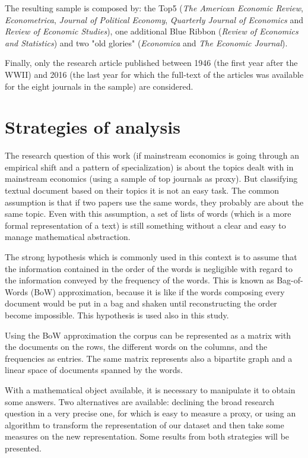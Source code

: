 \documentclass[a4paper, 11pt, headings=standardclasses, tablecaptionsbelow]{scrartcl}
\begin{document}
The resulting sample is composed by: the Top5 (\textit{The American Economic Review}, \textit{Econometrica}, \textit{Journal of Political Economy}, \textit{Quarterly Journal of Economics} and \textit{Review of Economic Studies}), one additional Blue Ribbon (\textit{Review of Economics and Statistics}) and two "old glories" (\textit{Economica} and \textit{The Economic Journal}).

Finally, only the research article published between 1946 (the first year after the WWII) and 2016 (the last year for which the full-text of the articles was available for the eight journals in the sample) are considered.

\section{Strategies of analysis}
The research question of this work (if mainstream economics is going through an empirical shift and a pattern of specialization) is about the topics dealt with in mainstream economics (using a sample of top journals as proxy).
But classifying textual document based on their topics it is not an easy task. The common assumption is that if two papers use the same words, they probably are about the same topic. Even with this assumption, a set of lists of words (which is a more formal representation of a text) is still something without a clear and easy to manage mathematical abstraction.

The strong hypothesis which is commonly used in this context is to assume that the information contained in the order of the words is negligible with regard to the information conveyed by the frequency of the words. This is known as Bag-of-Words (BoW) approximation, because it is like if the words composing every document would be put in a bag and shaken until reconstructing the order become impossible. This hypothesis is used also in this study.

Using the BoW approximation the corpus can be represented as a matrix with the documents on the rows, the different words on the columns, and the frequencies as entries. The same matrix represents also a bipartite graph and a linear space of documents spanned by the words.

With a mathematical object available, it is necessary to manipulate it to obtain some answers. Two alternatives are available: declining the broad research question in a very precise one, for which is easy to measure a proxy, or using an algorithm to transform the representation of our dataset and then take some measures on the new representation.
Some results from both strategies will be presented.
\end{document}
